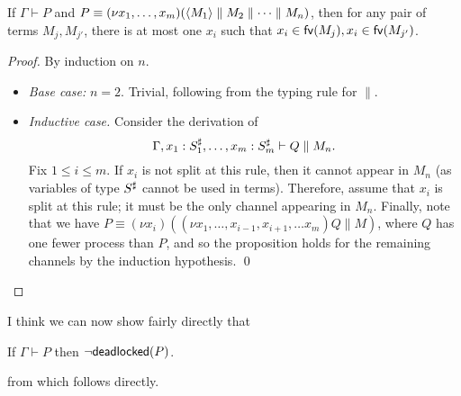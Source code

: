 \documentclass[orivec,envcountsame]{llncs}
\begin{document}
\begin{lemma}\label{thm:procs-share-one-channel}
  If $\Gamma \vdash P$ and $P \equiv (\nu x_1,\dots,x_m)(\langle M_1 \rangle \parallel M_2 \parallel
  \dots \parallel M_n)$, then for any pair of terms $M_j,M_{j'}$, there is at most one $x_i$ such
  that $x_i \in \mathsf{fv}(M_j),x_i \in \mathsf{fv}(M_{j'})$.
\end{lemma}

\begin{proof}
  By induction on $n$.
  \begin{itemize}
  \item \textit{Base case:} $n = 2$.  Trivial, following from the typing rule for $\parallel$.
  \item \textit{Inductive case.} Consider the derivation of
    \[ \Gamma,x_1:S_1^\sharp,\dots,x_m:S_m^\sharp \vdash Q \parallel M_n. \] Fix $1 \leq i
    \leq m$.  If $x_i$ is not split at this rule, then it cannot appear in $M_n$ (as variables of
    type $S^\sharp$ cannot be used in terms).  Therefore, assume that $x_i$ is split at this
    rule; it must be the only channel appearing in $M_n$.  Finally, note that we have $P \equiv (\nu
    x_i)((\nu x_1,\dots,x_{i-1},x_{i+1},\dots x_m)Q \parallel M)$, where $Q$ has one fewer process
    than $P$, and so the proposition holds for the remaining channels by the induction
    hypothesis. \qed
  \end{itemize}
\end{proof}

I think we can now show fairly directly that

\begin{lemma}\label{thm:typed-configs-df}
  If $\Gamma \vdash P$ then $\lnot \mathsf{deadlocked}(P)$.
\end{lemma}
from which  follows directly.
\end{document}
